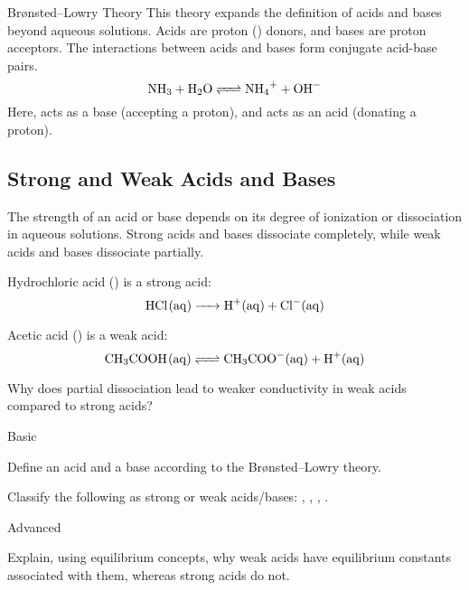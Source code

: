 \begin{keyconcept}{Brønsted–Lowry Theory}
This theory expands the definition of acids and bases beyond aqueous solutions. Acids are proton () donors, and bases are proton acceptors. The interactions between acids and bases form conjugate acid-base pairs.
\[
\ce{NH3 + H2O <=> NH4+ + OH-}
\]
Here,  acts as a base (accepting a proton), and  acts as an acid (donating a proton).
\end{keyconcept}


\subsection{Strong and Weak Acids and Bases}
\FloatBarrier
\FloatBarrier
\FloatBarrier

The strength of an acid or base depends on its degree of ionization or dissociation in aqueous solutions. Strong acids and bases dissociate completely, while weak acids and bases dissociate partially.

\begin{example}
Hydrochloric acid () is a strong acid:
\[
\ce{HCl(aq) -> H+(aq) + Cl-(aq)}
\]

Acetic acid () is a weak acid:
\[
\ce{CH3COOH(aq) <=> CH3COO-(aq) + H+(aq)}
\]
\end{example}

\begin{stopandthink}
Why does partial dissociation lead to weaker conductivity in weak acids compared to strong acids?
\end{stopandthink}

\begin{tieredquestions}{Basic}
\item Define an acid and a base according to the Brønsted–Lowry theory.
\item Classify the following as strong or weak acids/bases: , , , .
\end{tieredquestions}

\begin{tieredquestions}{Advanced}
\item Explain, using equilibrium concepts, why weak acids have equilibrium constants associated with them, whereas strong acids do not.
\end{tieredquestions}


